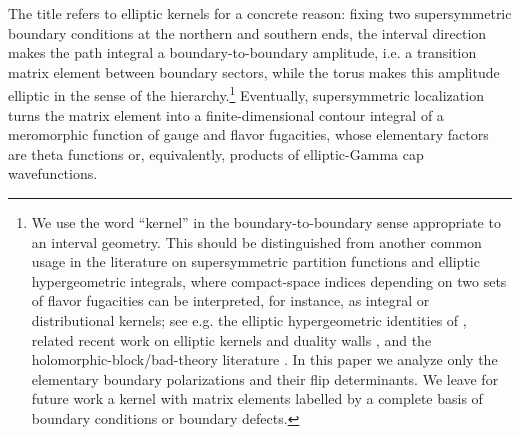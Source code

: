 \documentclass[11pt,a4paper]{article}
\makeatletter
\numberwithin{equation}{section}
\theoremstyle{plain}
\theoremstyle{definition}
\theoremstyle{remark}
\newcommand{\cyl}{\mathsf{Cyl}}
\newcounter{mathrecordid}
\newcommand{\mathboxbegin}[1]{%
  \stepcounter{mathrecordid}%
  \immediate\write\mathrecords{\themathrecordid,#1}%
  \special{pdf:bann << /Type /Annot /Subtype /Link /Border [0 0 0]
    /MathBoxID \themathrecordid /F 2
    /A << /S /URI /URI (urn:mathbox:\themathrecordid) >> >>}}
\newcommand{\mathboxinlineplain}[1]{$#1$}
\newcommand{\mathboxinline}[1]{%
  $\mathboxbegin{inline}#1\special{pdf:eann}$}
\newcommand{\recordmath}{%
  \ifmeasuring@\expandafter\mathboxinlineplain
  \else\expandafter\mathboxinline\fi}
\makeatother
\begin{document}
The title refers to elliptic kernels for a concrete reason: fixing two supersymmetric boundary conditions at the northern and southern ends, the interval direction makes the path integral a boundary-to-boundary amplitude, i.e. a transition matrix element between boundary sectors, while the torus makes this amplitude elliptic in the sense of the \recordmath{\cyl\times pt/S^1/T^2} hierarchy.\footnote{We use the word ``kernel'' in the boundary-to-boundary sense appropriate to an interval geometry. This should be distinguished from another common usage in the literature on supersymmetric partition functions and elliptic hypergeometric integrals, where compact-space indices depending on two sets of flavor fugacities can be interpreted, for instance, as integral or distributional kernels; see e.g. the elliptic hypergeometric identities of \cite{Spiridonov:2001ig,Rains:2003}, related recent work on elliptic kernels and duality walls \cite{Bottini:2021vms,Benvenuti:2024mpn}, and the holomorphic-block/bad-theory literature \cite{Pasquetti:2011fj,Beem:2012mb,Nieri:2015yia,Giacomelli:2023zkk,Giacomelli:2024laq}. In this paper we analyze only the elementary \recordmath{D/R} boundary polarizations and their flip determinants. We leave for future work a  kernel with matrix elements labelled by a complete basis of boundary conditions or boundary defects.} Eventually, supersymmetric localization turns the matrix element into a finite-dimensional contour integral of a meromorphic function of gauge and flavor fugacities, whose elementary factors are theta functions or, equivalently, products of elliptic-Gamma cap wavefunctions.
\end{document}
